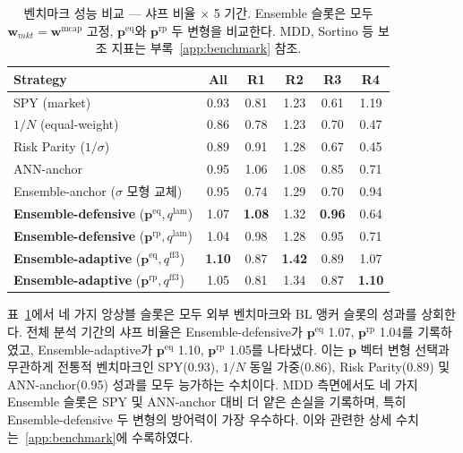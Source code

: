 \documentclass[eng]{kjas3}
\begin{document}
\begin{table}[t]
\centering
\caption{벤치마크 성능 비교 — 샤프 비율 $\times$ 5 기간. Ensemble 슬롯은 모두 $\mathbf{w}_{mkt} = \mathbf{w}^{\mathrm{mcap}}$ 고정, $\mathbf{p}^{\mathrm{eq}}$와 $\mathbf{p}^{\mathrm{rp}}$ 두 변형을 비교한다. MDD, Sortino 등 보조 지표는 부록~\ref{app:benchmark} 참조.}
\label{tab:benchmark_sharpe}
\setlength{\tabcolsep}{6pt}
\renewcommand{\arraystretch}{1.15}
\small
\begin{tabular}{lccccc}
\toprule
Strategy & All & R1 & R2 & R3 & R4 \\
\midrule
SPY (market)                       & 0.93 & 0.81 & 1.23 & 0.61 & 1.19 \\
$1/N$ (equal-weight)               & 0.86 & 0.78 & 1.23 & 0.70 & 0.47 \\
Risk Parity ($1/\sigma$)           & 0.89 & 0.91 & 1.28 & 0.67 & 0.45 \\
ANN-anchor \citep{pyo2018}         & 0.95 & 1.06 & 1.08 & 0.85 & 0.71 \\
Ensemble-anchor ($\sigma$ 모형 교체) & 0.95 & 0.74 & 1.29 & 0.70 & 0.94 \\
\midrule
\textbf{Ensemble-defensive} ($\mathbf{p}^{\mathrm{eq}}, q^{\mathrm{lam}}$)
                                   & 1.07 & \textbf{1.08} & 1.32 & \textbf{0.96} & 0.64 \\
\textbf{Ensemble-defensive} ($\mathbf{p}^{\mathrm{rp}}, q^{\mathrm{lam}}$)
                                   & 1.04 & 0.98 & 1.28 & 0.95 & 0.71 \\
\textbf{Ensemble-adaptive} ($\mathbf{p}^{\mathrm{eq}}, q^{\mathrm{ff3}}$)
                                   & \textbf{1.10} & 0.87 & \textbf{1.42} & 0.89 & 1.07 \\
\textbf{Ensemble-adaptive} ($\mathbf{p}^{\mathrm{rp}}, q^{\mathrm{ff3}}$)
                                   & 1.05 & 0.81 & 1.34 & 0.87 & \textbf{1.10} \\
\bottomrule
\end{tabular}
\end{table}

표~\ref{tab:benchmark_sharpe}에서 네 가지 앙상블 슬롯은 모두 외부 벤치마크와 BL 앵커 슬롯의 성과를 상회한다. 전체 분석 기간의 샤프 비율은 Ensemble-defensive가 $\mathbf{p}^{\mathrm{eq}}$ 1.07, $\mathbf{p}^{\mathrm{rp}}$ 1.04를 기록하였고, Ensemble-adaptive가 $\mathbf{p}^{\mathrm{eq}}$ 1.10, $\mathbf{p}^{\mathrm{rp}}$ 1.05를 나타냈다. 이는 $\mathbf{p}$ 벡터 변형 선택과 무관하게 전통적 벤치마크인 SPY(0.93), $1/N$ 동일 가중(0.86), Risk Parity(0.89) 및 ANN-anchor(0.95) 성과를 모두 능가하는 수치이다. MDD 측면에서도 네 가지 Ensemble 슬롯은 SPY 및 ANN-anchor 대비 더 얕은 손실을 기록하며, 특히 Ensemble-defensive 두 변형의 방어력이 가장 우수하다. 이와 관련한 상세 수치는~\ref{app:benchmark}에 수록하였다.
\end{document}
